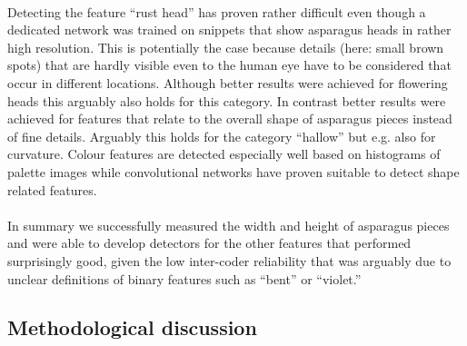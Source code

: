 \\
Detecting the feature “rust head” has proven rather difficult even though a dedicated network was trained on snippets that show asparagus heads in rather high resolution. This is potentially the case because details (here: small brown spots) that are hardly visible even to the human eye have to be considered that occur in different locations. Although better results were achieved for flowering heads this arguably also holds for this category. In contrast better results were achieved for features that relate to the overall shape of asparagus pieces  instead of fine details. Arguably this holds for the category “hallow” but e.g. also for curvature. Colour features are detected especially well based on histograms of palette images while convolutional networks have proven suitable to detect shape related features.\\
\\
In summary we successfully measured the width and height of asparagus pieces and were able to develop detectors for the other features that performed surprisingly good, given the low inter-coder reliability that was arguably due to unclear definitions of binary features such as “bent” or “violet.” 



\subsection{Methodological discussion}
\label{sec:DiscussionMethodology}

